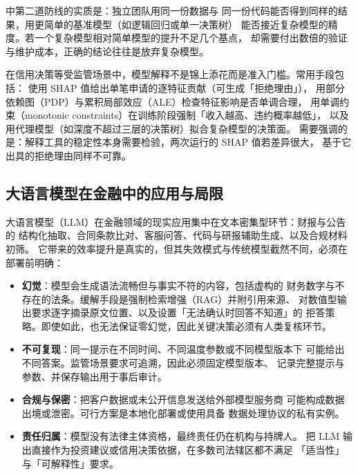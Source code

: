  中第二道防线的实质是：独立团队用同一份数据与
同一份代码能否得到同样的结果，用更简单的基准模型（如逻辑回归或单一决策树）
能否接近复杂模型的精度。若一个复杂模型相对简单模型的提升不足几个基点，
却需要付出数倍的验证与维护成本，正确的结论往往是放弃复杂模型。

\begin{appbox}[可解释性的工程实现]
在信用决策等受监管场景中，模型解释不是锦上添花而是准入门槛。常用手段包括：
使用 SHAP 值给出单笔申请的逐特征贡献（可生成「拒绝理由」），
用部分依赖图（PDP）与累积局部效应（ALE）检查特征影响是否单调合理，
用单调约束（monotonic constraints）在训练阶段强制「收入越高、违约概率越低」，
以及用代理模型（如深度不超过三层的决策树）拟合复杂模型的决策面。
需要强调的是：解释工具的稳定性本身需要检验，两次运行的 SHAP 值若差异很大，
基于它出具的拒绝理由同样不可靠。
\end{appbox}

\subsection{大语言模型在金融中的应用与局限}

大语言模型（LLM）在金融领域的现实应用集中在文本密集型环节：财报与公告的
结构化抽取、合同条款比对、客服问答、代码与研报辅助生成、以及合规材料初筛。
它带来的效率提升是真实的，但其失效模式与传统模型截然不同，必须在部署前明确：

\begin{itemize}[leftmargin=*]
  \item \textbf{幻觉}：模型会生成语法流畅但与事实不符的内容，包括虚构的
        财务数字与不存在的法条。缓解手段是强制检索增强（RAG）并附引用来源、
        对数值型输出要求逐字摘录原文位置、以及设置「无法确认时回答不知道」的
        拒答策略。即使如此，也无法保证零幻觉，因此关键决策必须有人类复核环节。
  \item \textbf{不可复现}：同一提示在不同时间、不同温度参数或不同模型版本下
        可能给出不同答案。监管场景要求可追溯，因此必须固定模型版本、
        记录完整提示与参数、并保存输出用于事后审计。
  \item \textbf{合规与保密}：把客户数据或未公开信息发送给外部模型服务商
        可能构成数据出境或泄密。可行方案是本地化部署或使用具备
        数据处理协议的私有实例。
  \item \textbf{责任归属}：模型没有法律主体资格，最终责任仍在机构与持牌人。
        把 LLM 输出直接作为投资建议或信用决策依据，在多数司法辖区都不满足
        「适当性」与「可解释性」要求。
\end{itemize}

